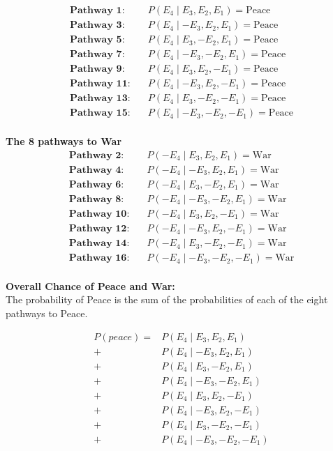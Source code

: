 \documentclass{article}
\begin{document}
\begin{align*}
\textbf{Pathway 1:} &\quad P(E_4 \mid E_3, E_2, E_1) = \text{Peace} \\
\textbf{Pathway 3:} &\quad P(E_4 \mid -E_3, E_2, E_1) = \text{Peace} \\
\textbf{Pathway 5:} &\quad P(E_4 \mid E_3, -E_2, E_1) = \text{Peace} \\
\textbf{Pathway 7:} &\quad P(E_4 \mid -E_3, -E_2, E_1) = \text{Peace} \\
\textbf{Pathway 9:} &\quad P(E_4 \mid E_3, E_2, -E_1) = \text{Peace} \\
\textbf{Pathway 11:} &\quad P(E_4 \mid -E_3, E_2, -E_1) = \text{Peace} \\
\textbf{Pathway 13:} &\quad P(E_4 \mid E_3, -E_2, -E_1) = \text{Peace} \\
\textbf{Pathway 15:} &\quad P(E_4 \mid -E_3, -E_2, -E_1) = \text{Peace}\\
\end{align*}

\textbf{The 8 pathways to War}\\

\begin{align*}
\textbf{Pathway 2:} &\quad P(-E_4 \mid E_3, E_2, E_1) = \text{War} \\
\textbf{Pathway 4:} &\quad P(-E_4 \mid -E_3, E_2, E_1) = \text{War} \\
\textbf{Pathway 6:} &\quad P(-E_4 \mid E_3, -E_2, E_1) = \text{War} \\
\textbf{Pathway 8:} &\quad P(-E_4 \mid -E_3, -E_2, E_1) = \text{War} \\
\textbf{Pathway 10:} &\quad P(-E_4 \mid E_3, E_2, -E_1) = \text{War} \\
\textbf{Pathway 12:} &\quad P(-E_4 \mid -E_3, E_2, -E_1) = \text{War} \\
\textbf{Pathway 14:} &\quad P(-E_4 \mid E_3, -E_2, -E_1) = \text{War} \\
\textbf{Pathway 16:} &\quad P(-E_4 \mid -E_3, -E_2, -E_1) = \text{War}
\end{align*}\\

\textbf{Overall Chance of Peace and War:}\\

The probability of Peace is the sum of the probabilities of each of the eight pathways to Peace.

\begin{align*}
P(peace) = &P(E_4 \mid E_3, E_2, E_1) \\
         + &P(E_4 \mid -E_3, E_2, E_1) \\
         + &P(E_4 \mid E_3, -E_2, E_1) \\
         + &P(E_4 \mid -E_3, -E_2, E_1) \\
         + &P(E_4 \mid E_3, E_2, -E_1) \\
         + &P(E_4 \mid -E_3, E_2, -E_1) \\
         + &P(E_4 \mid E_3, -E_2, -E_1) \\
         + &P(E_4 \mid -E_3, -E_2, -E_1)
\end{align*}
\end{document}
